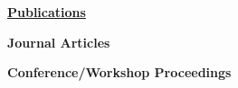 \documentclass[letterpaper,11pt]{article}
\newcommand{\resheading}[1]{{\large \colorbox{mygrey}{\begin{minipage}{\textwidth}{\textbf{#1 \vphantom{p\^{E}}}}\end{minipage}}}}
\begin{document}
\resheading{\href{http://scholar.google.com/citations?user=6l5Wb4QAAAAJ&hl=en\%22}{Publications}}
\begingroup
\renewcommand{\section}[2]{}
%
\begin{description}
\item\textbf{Journal Articles}
%
%
\item\textbf{Conference/Workshop Proceedings}
%
%
%
%
\end{description}
%
\endgroup
\end{document}
